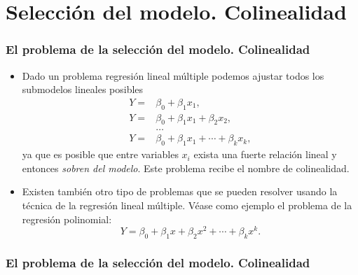 \section{Selección del modelo. Colinealidad}
\begin{frame}
\frametitle{El problema de la selección del modelo. Colinealidad}
\begin{itemize}
\item<2->{Dado un problema regresión lineal múltiple podemos  ajustar
todos los submodelos lineales posibles
$$
\begin{array}{rl}
Y=&\beta_0+ \beta_1 x_1,\\
Y=&\beta_0+ \beta_1 x_1+\beta_2 x_2,\\
&\ldots\\
Y=&\beta_0+ \beta_1 x_1+\cdots +\beta_k x_k,
\end{array}
$$
ya que es posible que entre variables $x_i$ exista una fuerte
relación lineal y entonces \emph{sobren del modelo}. Este problema
recibe el nombre de colinealidad.}
\item<3->{Existen también otro tipo de problemas que se pueden resolver usando la técnica de la regresión lineal múltiple. Véase como ejemplo el problema de la regresión polinomial:
$$Y=\beta_0+ \beta_1 x+\beta_2 x^2+\cdots +\beta_k x^k.$$
}
\end{itemize}
\end{frame}
\begin{frame}
\frametitle{El problema de la selección del modelo. Colinealidad}
\end{frame}

